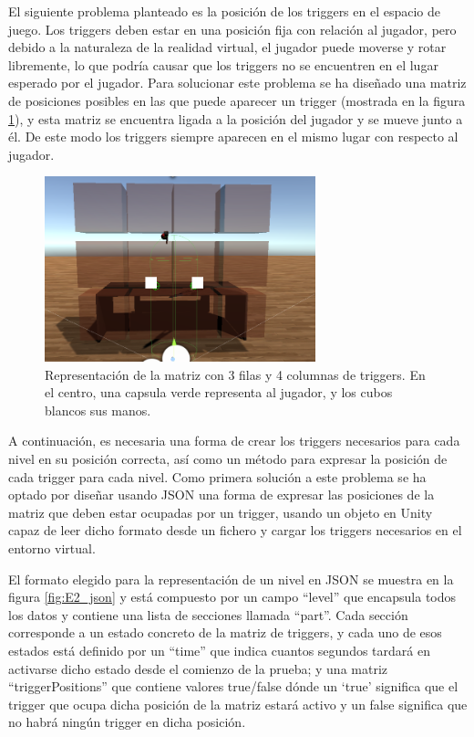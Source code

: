 El siguiente problema planteado es la posición de los triggers en el espacio de juego.  Los triggers deben estar en una posición fija con relación al jugador, pero debido a la naturaleza de la realidad virtual, el jugador puede moverse y rotar libremente, lo que podría causar que los triggers no se encuentren en el lugar esperado por el jugador. Para solucionar este problema se ha diseñado una matriz de posiciones posibles en las que puede aparecer un trigger (mostrada en la figura \ref{fig:E2_spawnArray}), y esta matriz se encuentra ligada a la posición del jugador y se mueve junto a él. De este modo los triggers siempre aparecen en el mismo lugar con respecto al jugador.


\begin{figure}
  \centering
    \includegraphics[width=0.7\textwidth]{04.Desarrollo/02.Entrega2/02.Iteracion2_2/00.Figuras/04.spawn_array.png}
    \caption{Representación de la matriz con 3 filas y 4 columnas de triggers. En el centro, una capsula verde representa al jugador, y los cubos blancos sus manos.}
    \label{fig:E2_spawnArray}
\end{figure}

A continuación, es necesaria una forma de crear los triggers necesarios para cada nivel en su posición correcta, así como un método para expresar la posición de cada trigger para cada nivel. Como primera solución a este problema se ha optado por diseñar usando JSON una forma de expresar las posiciones de la matriz que deben estar ocupadas por un trigger, usando un objeto en Unity capaz de leer dicho formato desde un fichero y cargar los triggers necesarios en el entorno virtual.

El formato elegido para la representación de un nivel en JSON se muestra en la figura \ref{fig:E2_json} y está compuesto por un campo “level” que encapsula todos los datos y contiene una lista de secciones llamada “part”. Cada sección corresponde a un estado concreto de la matriz de triggers, y cada uno de esos estados está definido por un “time” que indica cuantos segundos tardará en activarse dicho estado desde el comienzo de la prueba; y una matriz “triggerPositions” que contiene valores true/false dónde un ‘true’ significa que el trigger que ocupa dicha posición de la matriz estará activo y un false significa que no habrá ningún trigger en dicha posición.


